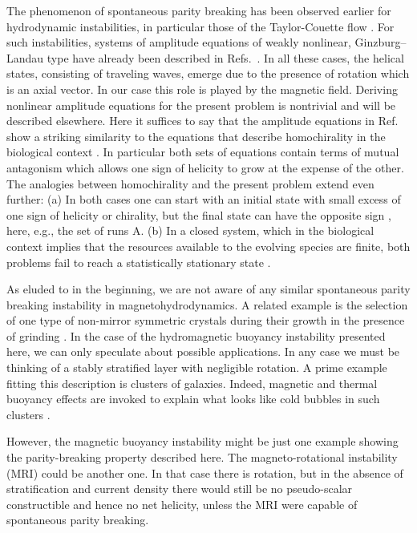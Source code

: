 \documentclass[twocolumn,showpacs,preprintnumbers,superscriptaddress]{revtex4}
\begin{document}
The phenomenon of spontaneous parity breaking has been observed 
earlier for hydrodynamic instabilities, in particular those of
the Taylor-Couette flow \cite{Hof}. 
For such instabilities, systems of amplitude equations
of weakly nonlinear, Ginzburg--Landau type 
have already been described in Refs.~\cite{Fau,Hof}.
In all these cases, the helical states, consisting of traveling waves,
emerge due to the presence of rotation which is an axial vector. 
In our case this role is played by the magnetic field.
Deriving nonlinear amplitude equations for the present problem is nontrivial
and will be described elsewhere. 
Here it suffices to say that the amplitude equations in Ref.~\cite{Fau}
show a striking similarity to the equations
that describe homochirality in the biological context \cite{Frank}. 
In particular both sets of equations contain terms of mutual antagonism
which allows one sign of helicity to grow at the expense of the other. 
The analogies between homochirality and the present problem extend even further:
(a) In both cases one can start
      with an initial state with small excess of one sign of
      helicity or chirality,
      but the final state can have the opposite sign \cite{BM04},
      here, e.g., the set of runs A.
(b) In a closed system, which in the biological context implies
that the resources available to the evolving species are
finite, both problems fail to reach a statistically
stationary state \cite{Soai,PB10}.

As eluded to in the beginning, we are not aware of any similar
spontaneous parity breaking instability in magnetohydrodynamics.
A related example is the selection of one type of
non-mirror symmetric crystals during their growth in the presence
of grinding \cite{Noo08,MBT08}.
In the case of the hydromagnetic buoyancy instability presented
here, we can only speculate about possible applications.
In any case we must be thinking of a stably
stratified layer with negligible rotation.
A prime example fitting this description is clusters of galaxies.
Indeed, magnetic and thermal buoyancy effects are invoked to
explain what looks like cold bubbles in such clusters
\cite{Rob04}.

However, the magnetic buoyancy instability might be just one example
showing the parity-breaking
property described here. The magneto-rotational instability (MRI)
could be another one.
In that case there is rotation, but in the absence of stratification
and current density there would still be no
pseudo-scalar constructible and hence no
net helicity, unless the MRI were capable of
spontaneous parity breaking.
\end{document}
